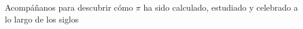\documentclass[preview]{standalone}
\begin{document}
\begin{center}
Acompáñanos para descubrir cómo $\pi$ ha sido calculado, estudiado y celebrado a lo largo de los siglos
\end{center}
\end{document}
